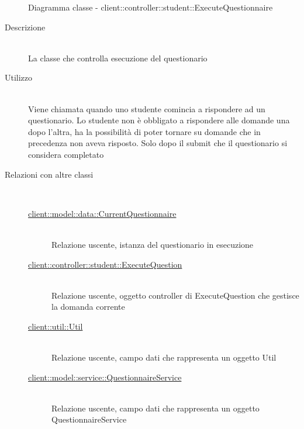 \vspace{0.5cm}
\hypertarget{client::controller::student::ExecuteQuestionnaire}{}
\begin{figure}[H]
	\centering
	\caption{Diagramma classe - client::controller::student::ExecuteQuestionnaire}
\end{figure}\begin{description}
\item[Descrizione] \hfill \\
La classe che controlla esecuzione del questionario 
\item[Utilizzo] \hfill \\
Viene chiamata quando uno studente comincia a rispondere ad un questionario. Lo studente non è obbligato a rispondere alle domande una dopo l'altra, ha la possibilità di poter tornare su domande che in precedenza non aveva risposto. Solo dopo il submit che il questionario si considera completato
\item[Relazioni con altre classi] \hfill \\
\vspace{-7mm}
\begin{description}
	\item[\hyperlink{client::model::data::CurrentQuestionnaire}{client::model::data::CurrentQuestionnaire}] \hfill \\
	Relazione uscente, istanza del questionario in esecuzione
	\item[\hyperlink{client::controller::student::ExecuteQuestion}{client::controller::student::ExecuteQuestion}] \hfill \\
	Relazione uscente, oggetto controller di ExecuteQuestion che gestisce la domanda corrente
	\item[\hyperlink{client::util::Util}{client::util::Util}] \hfill \\
	Relazione uscente, campo dati che rappresenta un oggetto Util
	\item[\hyperlink{client::model::service::QuestionnaireService}{client::model::service::QuestionnaireService}] \hfill \\
	Relazione uscente, campo dati che rappresenta un oggetto QuestionnaireService
\end{description}


\end{description}

